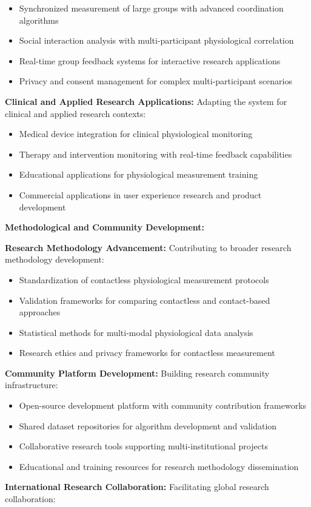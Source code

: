\documentclass[12pt,a4paper]{report}
\begin{document}
\begin{itemize}
\item Synchronized measurement of large groups with advanced coordination algorithms
\item Social interaction analysis with multi-participant physiological correlation
\item Real-time group feedback systems for interactive research applications
\item Privacy and consent management for complex multi-participant scenarios

\end{itemize}
\textbf{Clinical and Applied Research Applications:}
Adapting the system for clinical and applied research contexts:

\begin{itemize}
\item Medical device integration for clinical physiological monitoring
\item Therapy and intervention monitoring with real-time feedback capabilities
\item Educational applications for physiological measurement training
\item Commercial applications in user experience research and product development

\end{itemize}
\textbf{Methodological and Community Development:}

\textbf{Research Methodology Advancement:}
Contributing to broader research methodology development:

\begin{itemize}
\item Standardization of contactless physiological measurement protocols
\item Validation frameworks for comparing contactless and contact-based approaches
\item Statistical methods for multi-modal physiological data analysis
\item Research ethics and privacy frameworks for contactless measurement

\end{itemize}
\textbf{Community Platform Development:}
Building research community infrastructure:

\begin{itemize}
\item Open-source development platform with community contribution frameworks
\item Shared dataset repositories for algorithm development and validation
\item Collaborative research tools supporting multi-institutional projects
\item Educational and training resources for research methodology dissemination

\end{itemize}
\textbf{International Research Collaboration:}
Facilitating global research collaboration:
\end{document}
